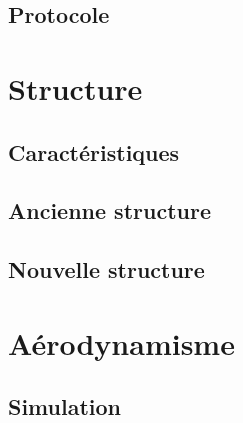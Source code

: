 \documentclass{beamer}
\begin{document}
\begin{frame}{}
 
\end{frame}


\subsection{Protocole}

\begin{frame}{}
 
\end{frame}


\section{Structure}

\subsection{Caractéristiques}

\begin{frame}{}
 
\end{frame}


\subsection{Ancienne structure}

\begin{frame}{}
 
\end{frame}


\subsection{Nouvelle structure}

\begin{frame}{}
 
\end{frame}


\section{Aérodynamisme}

\subsection{Simulation}

\begin{frame}{}
 
\end{frame}
\end{document}
